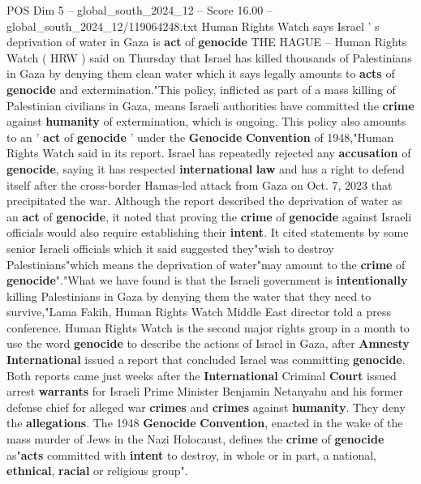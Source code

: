 \begin{textsample}{POS Dim 5 – global\_south\_2024\_12 – Score 16.00 – global\_south\_2024\_12/119064248.txt}  \label{ex:f5_pos_055}
Human Rights Watch says Israel ' s deprivation of water in Gaza is \textbf{act} of \textbf{genocide} THE HAGUE -- Human Rights Watch ( HRW ) said on Thursday that Israel has killed thousands of Palestinians in Gaza by denying them clean water which it says legally amounts to \textbf{acts} of \textbf{genocide} and extermination."This policy, inflicted as part of a mass killing of Palestinian civilians in Gaza, means Israeli authorities have committed the \textbf{crime} against \textbf{humanity} of extermination, which is ongoing.
This policy also amounts to an ' \textbf{act} of \textbf{genocide} ' under the \textbf{Genocide} \textbf{Convention} of 1948,"Human Rights Watch said in its report.
Israel has repeatedly rejected any \textbf{accusation} of \textbf{genocide}, saying it has respected \textbf{international} \textbf{law} and has a right to defend itself after the cross-border Hamas-led attack from Gaza on Oct. 7, 2023 that precipitated the war.
Although the report described the deprivation of water as an \textbf{act} of \textbf{genocide}, it noted that proving the \textbf{crime} of \textbf{genocide} against Israeli officials would also require establishing their \textbf{intent}.
It cited statements by some senior Israeli officials which it said suggested they"wish to destroy Palestinians"which means the deprivation of water"may amount to the \textbf{crime} of \textbf{genocide}"."What we have found is that the Israeli government is \textbf{intentionally} killing Palestinians in Gaza by denying them the water that they need to survive,"Lama Fakih, Human Rights Watch Middle East director told a press conference.
Human Rights Watch is the second major rights group in a month to use the word \textbf{genocide} to describe the actions of Israel in Gaza, after \textbf{Amnesty} \textbf{International} issued a report that concluded Israel was committing \textbf{genocide}.
Both reports came just weeks after the \textbf{International} Criminal \textbf{Court} issued arrest \textbf{warrants} for Israeli Prime Minister Benjamin Netanyahu and his former defense chief for alleged war \textbf{crimes} and \textbf{crimes} against \textbf{humanity}.
They deny the \textbf{allegations}.
The 1948 \textbf{Genocide} \textbf{Convention}, enacted in the wake of the mass murder of Jews in the Nazi Holocaust, defines the \textbf{crime} of \textbf{genocide} as"\textbf{acts} committed with \textbf{intent} to destroy, in whole or in part, a national, \textbf{ethnical}, \textbf{racial} or religious group".

\end{textsample}

